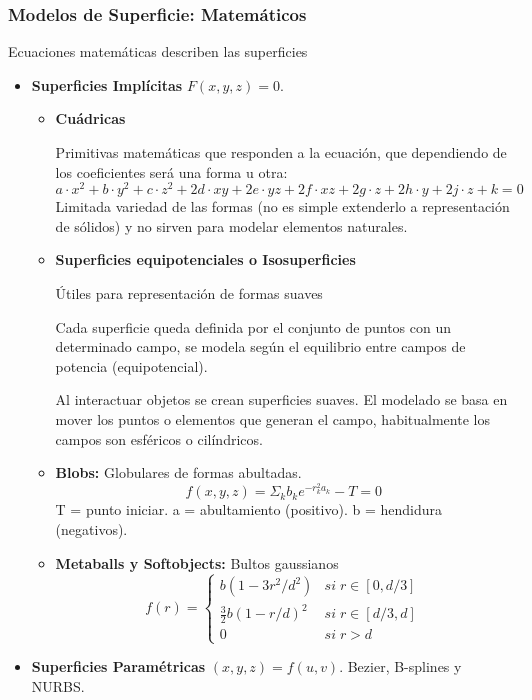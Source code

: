 \subsubsection{Modelos de Superficie: Matemáticos}
Ecuaciones matemáticas describen las superficies
\begin{itemize}
	\item \textbf{Superficies Implícitas} $F( x, y, z) = 0$.
	      \begin{itemize}
		      \item \textbf{Cuádricas}

		            Primitivas matemáticas que responden a la ecuación, que dependiendo de los coeficientes será una forma u otra:
		            $$a\cdot x^2+b\cdot y^2+c\cdot z^2+2d\cdot xy+2e\cdot yz+2f\cdot xz+2g\cdot z+2h\cdot y+2j\cdot z+k=0$$
		            Limitada variedad de las formas (no es simple extenderlo a representación de sólidos) y no sirven para modelar elementos naturales.

		      \item \textbf{Superficies equipotenciales o Isosuperficies}

		            Útiles para representación de formas suaves

		            Cada superficie queda definida por el conjunto de puntos con un determinado campo, se modela según el equilibrio entre campos de potencia (equipotencial).

		            Al interactuar objetos se crean superficies suaves. El modelado se basa en mover los puntos o elementos que generan el campo, habitualmente los campos son esféricos o cilíndricos.

		      \item \textbf{Blobs:} Globulares de formas abultadas.
		            $$f(x,y,z)=\Sigma_k b_k e^{-r_k^2a_k}-T=0$$
		            T = punto iniciar. a = abultamiento (positivo). b = hendidura (negativos).
		      \item \textbf{Metaballs y Softobjects:} Bultos gaussianos
		            $$f(r)=\begin{cases}b(1-3r^2/d^2) & si\; r \in [0,d/3]\\ \frac 3 2 b(1-r/d)^2 & si\; r \in [d/3,d] \\ 0 & si\; r>d\end{cases}$$
	      \end{itemize}
	\item \textbf{Superficies Paramétricas} $( x, y, z) = f( u, v)$. Bezier, B-splines y NURBS.


\end{itemize}
